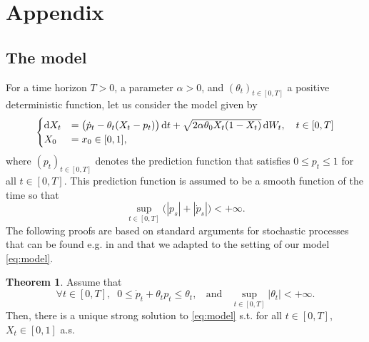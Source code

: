 \documentclass[11pt]{article}
\theoremstyle{definition}
\newtheorem{Thm}[Def]{Theorem}
\begin{document}


\section{Appendix} \label{Appendix}

\subsection{The model}
For a time horizon $T>0$, a parameter $\alpha > 0$, and $(\theta_t)_{t\in[0,T]}$ a positive deterministic  function,  let us consider the model  given by
\begin{equation}
\begin{cases}
\dif X_t &= \big(\dot p_t - \theta_t (X_t-p_t)  \big)\dif t  +\sqrt{2 \alpha \theta_0 X_t (1-X_t)} \dif W_t, \quad t\in[0,T] \\
X_0&= x_0\in [0,1],
\end{cases}  \label{eq:model}
\end{equation}
where $(p_t)_{t\in[0,T]}$ denotes the prediction function that satisfies $0\le p_t\le 1$ for all $t\in[0,T]$. This prediction function is assumed to be a smooth function of the time so that 
$$\sup_{t\in[0,T]}\bigl( |p_s| + |\dot p_s|\big) <+\infty .$$
The following proofs are based on standard arguments for stochastic processes that can be found e.g. in \cite{Alf} and \cite{KarShr} that we adapted to the setting of our model \eqref{eq:model}.
\begin{Thm}\label{thm:exun}
Assume that    
\begin{equation}\label{Assumption:1}
\forall  t\in[0,T],\;\; 0\le \dot p_t +\theta_tp_t\le \theta_t, \;\;\mbox{ and }\;\;
\sup_{t\in[0,T]}|\theta_t|<+\infty\tag{A}. 
\end{equation}
Then, there is a unique strong solution to \eqref{eq:model} s.t.  for all $t\in[0,T]$, $X_t\in[0,1]$ a.s.
\end{Thm}
\end{document}
